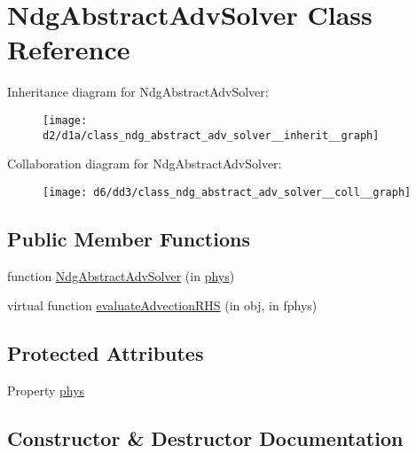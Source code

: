 \hypertarget{class_ndg_abstract_adv_solver}{}\section{Ndg\+Abstract\+Adv\+Solver Class Reference}
\label{class_ndg_abstract_adv_solver}


Inheritance diagram for Ndg\+Abstract\+Adv\+Solver\+:
\nopagebreak
\begin{figure}[H]
\begin{center}
\leavevmode
\texttt{[image: d2/d1a/class\_ndg\_abstract\_adv\_solver\_\_inherit\_\_graph]}
\end{center}
\end{figure}


Collaboration diagram for Ndg\+Abstract\+Adv\+Solver\+:
\nopagebreak
\begin{figure}[H]
\begin{center}
\leavevmode
\texttt{[image: d6/dd3/class\_ndg\_abstract\_adv\_solver\_\_coll\_\_graph]}
\end{center}
\end{figure}
\subsection*{Public Member Functions}
\begin{DoxyCompactItemize}
\item 
function \hyperlink{class_ndg_abstract_adv_solver_a40e4fbb4f48f2553857278e1abea9eef}{Ndg\+Abstract\+Adv\+Solver} (in \hyperlink{class_ndg_abstract_adv_solver_aef07c3e090321fa7a09d8120f74f5964}{phys})
\item 
virtual function \hyperlink{class_ndg_abstract_adv_solver_af61d7a5e867f7b8126fd1cc48750c41f}{evaluate\+Advection\+R\+HS} (in obj, in fphys)
\end{DoxyCompactItemize}
\subsection*{Protected Attributes}
\begin{DoxyCompactItemize}
\item 
Property \hyperlink{class_ndg_abstract_adv_solver_aef07c3e090321fa7a09d8120f74f5964}{phys}
\end{DoxyCompactItemize}


\subsection{Constructor \& Destructor Documentation}
\mbox{\label{class_ndg_abstract_adv_solver_a40e4fbb4f48f2553857278e1abea9eef}} 
